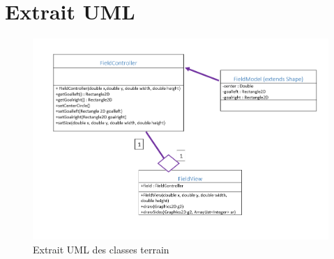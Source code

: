 \chapter{Extrait UML}

\begin{figure}[!h]
\begin{center}
\includegraphics[width=18cm]{./UML}
\end{center}
\caption{Extrait UML des classes terrain}
\end{figure}
